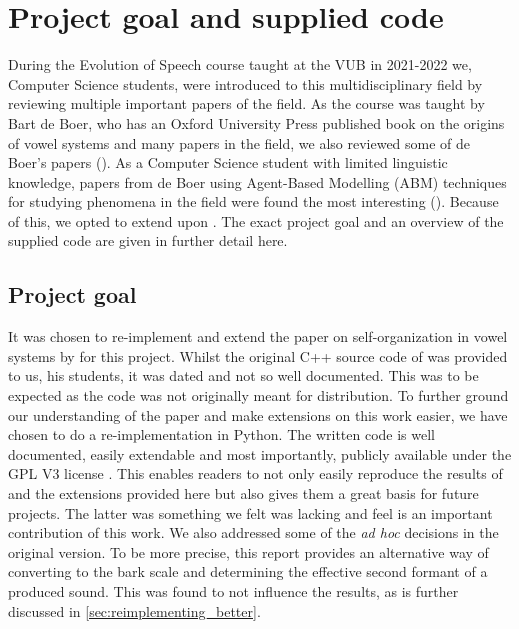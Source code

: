 \chapter{Project goal and supplied code}
\label{ch:general_remarks}

During the Evolution of Speech course taught at the VUB in 2021-2022 we, Computer Science students, were introduced to this multidisciplinary field by reviewing multiple important papers of the field.
As the course was taught by Bart de Boer, who has an Oxford  University Press published book on the origins of vowel systems and many papers in the field, we also reviewed some of de Boer's papers (\cite{deBoerBook, deBoer2000, deBoer2010, deBoer2018}).
As a Computer Science student with limited linguistic knowledge, papers from de Boer using Agent-Based Modelling (ABM) techniques for studying phenomena in the field were found the most interesting (\cite{deBoer2000, deBoer2010}).
Because of this, we opted to extend upon \citet{deBoer2000}.
The exact project goal and an overview of the supplied code are given in further detail here.


\section{Project goal}
\label{sec:general_remarks_why}
It was chosen to re-implement and extend the paper on self-organization in vowel systems by \citet{deBoer2000} for this project.
Whilst the original C++ source code of \citet{deBoer2000} was provided to us, his students, it was dated and not so well documented.
This was to be expected as the code was not originally meant for distribution.
To further ground our understanding of the paper and make extensions on this work easier, we have chosen to do a re-implementation in Python.
The written code is well documented, easily extendable and most importantly, publicly available under the GPL V3 license \citep{gplv3, github_project}.
This enables readers to not only easily reproduce the results of \citet{deBoer2000} and the extensions provided here but also gives them a great basis for future projects.
The latter was something we felt was lacking and feel is an important contribution of this work.
We also addressed some of the \textit{ad hoc} decisions in the original version.
To be more precise, this report provides an alternative way of converting to the bark scale and determining the effective second formant of a produced sound.
This was found to not influence the results, as is further discussed in \ref{sec:reimplementing_better}.

